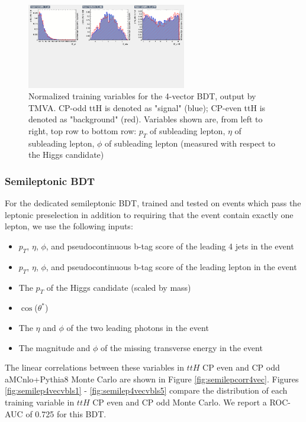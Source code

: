 \begin{figure}[htbp]
  \centering
  \includegraphics[width=0.62\textwidth]{figures/TMVABDTStudies/dilep-vbls4vec/dilep4vecvbls4.png}
  \caption{Normalized training variables for the 4-vector BDT, output by TMVA. CP-odd ttH is denoted as "signal" (blue); CP-even ttH is denoted as "background" (red). Variables shown are, from left to right, top row to bottom row: $p_{T}$ of subleading lepton, $\eta$ of subleading lepton, $\phi$ of subleading lepton (measured with respect to the Higgs candidate)}
  \label{fig:dilep4vecvbls4}
\end{figure}

\subsubsection{Semileptonic BDT}
For the dedicated semileptonic BDT, trained and tested on events which pass the leptonic preselection in addition to requiring that the event contain exactly one lepton, we use the following inputs:
\begin{itemize}
\item $p_{T}$, $\eta$, $\phi$, and pseudocontinuous b-tag score of the leading 4 jets in the event
\item $p_{T}$, $\eta$, $\phi$, and pseudocontinuous b-tag score of the leading lepton in the event
\item The $p_{T}$ of the Higgs candidate (scaled by mass)
\item  $\cos$($\theta^{*}$)
\item The $\eta$ and $\phi$ of the two leading photons in the event
\item The magnitude and $\phi$ of the missing transverse energy in the event
\end{itemize} 

The linear correlations between these variables in $ttH$ CP even and CP odd aMCnlo+Pythia8 Monte Carlo are shown in Figure \ref{fig:semilepcorr4vec}.  Figures \ref{fig:semilep4vecvbls1} - \ref{fig:semilep4vecvbls5} compare the distribution of each training variable in $ttH$ CP even and CP odd Monte Carlo. We report a ROC-AUC of 0.725 for this BDT.

